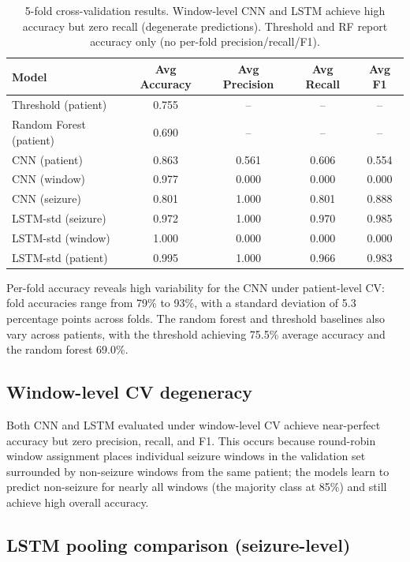\documentclass[11pt,a4paper]{article}
\begin{document}
\begin{table}[H]
\centering
\begin{tabular}{lcccc}
\toprule
Model & Avg Accuracy & Avg Precision & Avg Recall & Avg F1 \\
\midrule
Threshold (patient) & 0.755 & -- & -- & -- \\
Random Forest (patient) & 0.690 & -- & -- & -- \\
CNN (patient) & \num{0.863} & \num{0.561} & \num{0.606} & \num{0.554} \\
CNN (window) & \num{0.977} & 0.000 & 0.000 & 0.000 \\
CNN (seizure) & \num{0.801} & 1.000 & \num{0.801} & \num{0.888} \\
LSTM-std (seizure) & \num{0.972} & 1.000 & \num{0.970} & \num{0.985} \\
LSTM-std (window) & 1.000 & 0.000 & 0.000 & 0.000 \\
LSTM-std (patient) & \num{0.995} & 1.000 & \num{0.966} & \num{0.983} \\
\bottomrule
\end{tabular}
\caption{5-fold cross-validation results. Window-level CNN and LSTM achieve high accuracy but zero recall (degenerate predictions). Threshold and RF report accuracy only (no per-fold precision/recall/F1).}
\label{tab:main_results}
\end{table}

Per-fold accuracy reveals high variability for the CNN under patient-level CV: fold accuracies range from 79\% to 93\%, with a standard deviation of 5.3 percentage points across folds.
The random forest and threshold baselines also vary across patients, with the threshold achieving 75.5\% average accuracy and the random forest 69.0\%.

\subsection{Window-level CV degeneracy}

Both CNN and LSTM evaluated under window-level CV achieve near-perfect accuracy but zero precision, recall, and F1.
This occurs because round-robin window assignment places individual seizure windows in the validation set surrounded by non-seizure windows from the same patient; the models learn to predict non-seizure for nearly all windows (the majority class at 85\%) and still achieve high overall accuracy.

\subsection{LSTM pooling comparison (seizure-level)}
\end{document}
